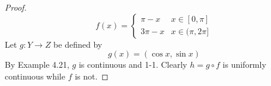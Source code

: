 \documentclass[../psets.tex]{subfiles}
\begin{document}
\begin{enumerate}[label={\textbf{\arabic*.}}]
\begin{proof}
\begin{equation*}
            f(x) =
            \begin{cases}
                \pi-x & x\in[0,\pi]\\
                3\pi-x & x\in(\pi,2\pi]
            \end{cases}
        \end{equation*}
        Let $g:Y\to Z$ be defined by
        \begin{equation*}
            g(x) = (\cos x,\sin x)
        \end{equation*}
        By Example 4.21, $g$ is continuous and 1-1. Clearly $h=g\circ f$ is uniformly continuous while $f$ is not.
    \end{proof}
\end{enumerate}
\end{document}
